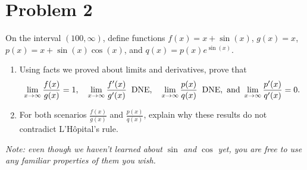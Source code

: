 \documentclass[11pt]{article}
\begin{document}
\pagebreak
\section{Problem 2}
    On the interval $(100, \infty)$, define functions $f(x) = x + \sin(x)$, $g(x) = x$, $p(x) = x + \sin(x)\cos(x)$, and $q(x) = p(x)e^{\sin(x)}$.
    \begin{enumerate}[label=(\alph*)]
        \item 
        Using facts we proved about limits and derivatives, prove that
        \begin{equation*}
            \lim_{x \to \infty} \frac{f(x)}{g(x)} = 1, \quad \lim_{x \to \infty} \frac{f'(x)}{g'(x)} \;\; \text{DNE}, \quad \lim_{x \to \infty} \frac{p(x)}{q(x)} \;\; \text{DNE}, \text{ and } \lim_{x \to \infty} \frac{p'(x)}{q'(x)} = 0.\\
        \end{equation*}
        \item 
        For both scenarios $\frac{f(x)}{g(x)}$ and $\frac{p(x)}{q(x)}$, explain why these results do not contradict L'H\^opital's rule.
        
    \end{enumerate}

    \textit{Note: even though we haven't learned about $\sin$ and $\cos$ yet, you are free to use any familiar properties of them you wish.}
\end{document}
